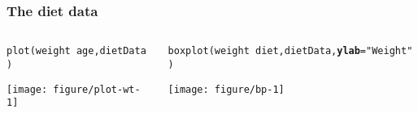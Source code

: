 \documentclass[color=usenames,dvipsnames]{beamer}\usepackage[]{graphicx}\usepackage[]{color}
\makeatletter
\newcommand{\hlstr}[1]{\textcolor[rgb]{0.749,0.012,0.012}{#1}}%
\newcommand{\hlopt}[1]{\textcolor[rgb]{0,0,0}{#1}}%
\newcommand{\hlstd}[1]{\textcolor[rgb]{0,0,0}{#1}}%
\newcommand{\hlkwc}[1]{\textcolor[rgb]{0,0,0}{\textbf{#1}}}%
\newcommand{\hlkwd}[1]{\textcolor[rgb]{0.004,0.004,0.506}{#1}}%
\newenvironment{kframe}{%
 \def\at@end@of@kframe{}%
 \ifinner\ifhmode%
  \def\at@end@of@kframe{\end{minipage}}%
  \begin{minipage}{\columnwidth}%
 \fi\fi%
 \def\FrameCommand##1{\hskip\@totalleftmargin \hskip-\fboxsep
 \colorbox{shadecolor}{##1}\hskip-\fboxsep
     \hskip-\linewidth \hskip-\@totalleftmargin \hskip\columnwidth}%
 \MakeFramed {\advance\hsize-\width
   \@totalleftmargin\z@ \linewidth\hsize
   \@setminipage}}%
 {\par\unskip\endMakeFramed%
 \at@end@of@kframe}
\newenvironment{knitrout}{}{} %
\makeatother
\begin{document}
\begin{frame}[fragile]
  \frametitle{The diet data}
  \begin{columns}
    \begin{column}{0.5\textwidth}
      \tiny %
\begin{knitrout}
\color{fgcolor}\begin{kframe}
\begin{alltt}
\hlkwd{plot}\hlstd{(weight} \hlopt{~} \hlstd{age, dietData)}
\end{alltt}
\end{kframe}
\end{knitrout}
    \texttt{[image: figure/plot-wt-1]}
    \end{column}
    \begin{column}{0.5\textwidth}
      \tiny %
\begin{knitrout}
\color{fgcolor}\begin{kframe}
\begin{alltt}
\hlkwd{boxplot}\hlstd{(weight} \hlopt{~} \hlstd{diet, dietData,} \hlkwc{ylab}\hlstd{=}\hlstr{"Weight"}\hlstd{)}
\end{alltt}
\end{kframe}
\end{knitrout}
    \texttt{[image: figure/bp-1]}
    \end{column}
  \end{columns}
\end{frame}
\end{document}
